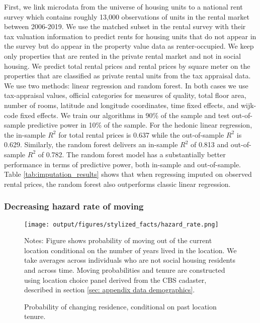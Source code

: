 \documentclass[11pt]{article}
\begin{document}
First, we link microdata from the universe of housing units to a national rent survey which contains roughly 13,000 observations of units in the rental market between 2006-2019. We use the matched subset in the rental survey with their tax valuation information to predict rents for housing units that do not appear in the survey but do appear in the property value data as renter-occupied. We keep only properties that are rented in the private rental market and not in social housing. We predict total rental prices and rental prices by square meter on the properties that are classified as private rental units from the tax appraisal data. We use two methods: linear regression and random forest. In both cases we use tax-appraisal values, official categories for measures of quality, total floor area, number of rooms, latitude and longitude coordinates, time fixed effects, and wijk-code fixed effects. We train our algorithms in 90\% of the sample and test out-of-sample predictive power in 10\% of the sample. For the hedonic linear regression, the in-sample $R^2$ for total rental prices is 0.637 while the out-of-sample $R^2$ is 0.629. Similarly, the random forest delivers an in-sample $R^2$ of 0.813 and out-of-sample $R^2$ of 0.782. The random forest model has a substantially better performance in terms of predictive power, both in-sample and out-of-sample. Table \ref{tab:imputation_results} shows that when regressing imputed on observed rental prices, the random forest also outperforms classic linear regression.

\subsubsection{Decreasing hazard rate of moving}\label{sec: evidence hazard rate} 

\begin{figure}[H]
    \caption{Probability of changing residence, conditional on past location tenure.}
    \label{fig: hazard_rate_all}
    \centering
    \texttt{[image: output/figures/stylized\_facts/hazard\_rate.png]}
    \begin{minipage}{\textwidth}{\scriptsize Notes: Figure shows probability of moving out of the current location conditional on the number of years lived in the location. We take averages across individuals who are not social housing residents and across time. Moving probabilities and tenure are constructed using location choice panel derived from the CBS cadaster, described in section \ref{sec: appendix data demographics}.}
    \end{minipage}
\end{figure}
\end{document}
